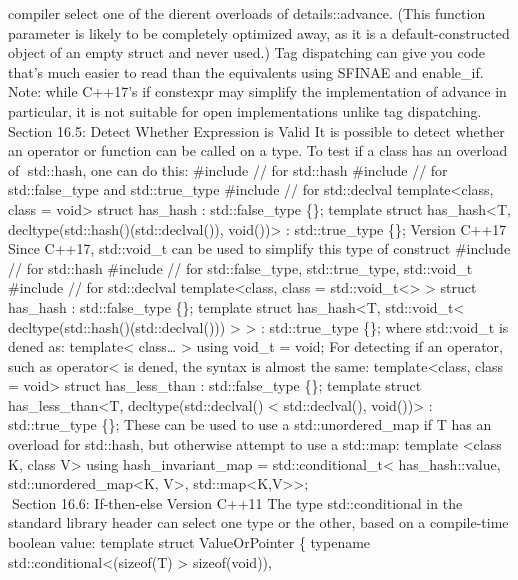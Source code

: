 {compiler select one of the dierent overloads of details::advance. (This
function parameter is likely to be completely optimized away, as it is a
default-constructed object of an empty struct and never used.) Tag
dispatching can give you code that's much easier to read than the
equivalents using SFINAE and enable\_if. Note: while C++17's if
constexpr may simplify the implementation of advance in particular, it
is not suitable for open implementations unlike tag dispatching. Section
16.5: Detect Whether Expression is Valid It is possible to detect
whether an operator or function can be called on a type. To test if a
class has an overload of std::hash, one can do this: \#include // for
std::hash \#include // for std::false\_type and std::true\_type
\#include // for std::declval template\textless class, class =
void\textgreater{} struct has\_hash : std::false\_type \{\}; template
struct has\_hash\textless T, decltype(std::hash()(std::declval()),
void())\textgreater{} : std::true\_type \{\}; Version C++17 Since C++17,
std::void\_t can be used to simplify this type of construct \#include //
for std::hash \#include // for std::false\_type, std::true\_type,
std::void\_t \#include // for std::declval template\textless class,
class = std::void\_t\textless\textgreater{} \textgreater{} struct
has\_hash : std::false\_type \{\}; template struct has\_hash\textless T,
std::void\_t\textless{} decltype(std::hash()(std::declval()))
\textgreater{} \textgreater{} : std::true\_type \{\}; where std::void\_t
is dened as: template\textless{} class\ldots{} \textgreater{} using
void\_t = void; For detecting if an operator, such as
operator\textless{} is dened, the syntax is almost the same:
template\textless class, class = void\textgreater{} struct
has\_less\_than : std::false\_type \{\}; template struct
has\_less\_than\textless T, decltype(std::declval() \textless{}
std::declval(), void())\textgreater{} : std::true\_type \{\}; These can
be used to use a std::unordered\_map if T has an overload for std::hash,
but otherwise attempt to use a std::map: template \textless class K,
class V\textgreater{} using hash\_invariant\_map =
std::conditional\_t\textless{} has\_hash::value,
std::unordered\_map\textless K, V\textgreater,
std::map\textless K,V\textgreater\textgreater;\\
Section 16.6: If-then-else Version C++11 The type std::conditional in
the standard library header can select one type or the other, based on a
compile-time boolean value: template struct ValueOrPointer \{ typename
std::conditional\textless(sizeof(T) \textgreater{} sizeof(void})),
